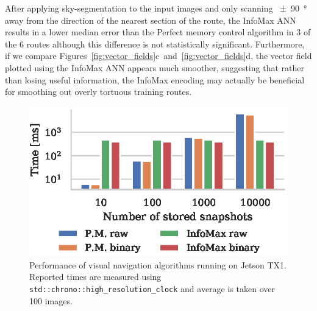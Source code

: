 \documentclass[letterpaper]{article}
\begin{document}
After applying sky-segmentation to the input images and only scanning \SI{\pm 90}{\degree} away from the direction of the nearest section of the route, the InfoMax ANN results in a lower median error than the Perfect memory control algorithm in 3 of the 6 routes although this difference is not statistically significant.
Furthermore, if we compare Figures~\ref{fig:vector_fields}c~and~\ref{fig:vector_fields}d, the vector field plotted using the InfoMax ANN appears much smoother, suggesting that rather than losing useful information, the InfoMax encoding may actually be beneficial for smoothing out overly tortuous training routes.

\begin{figure}[t]
    \centering
    \includegraphics{figures/jetson_test_performance.eps}
    \caption{Performance of visual navigation algorithms running on Jetson TX1. 
    Reported times are measured using \lstinline{std::chrono::high_resolution_clock} and average is taken over \num{100} images.}
    \label{fig:jetson_test_performance}
\end{figure}
\end{document}
